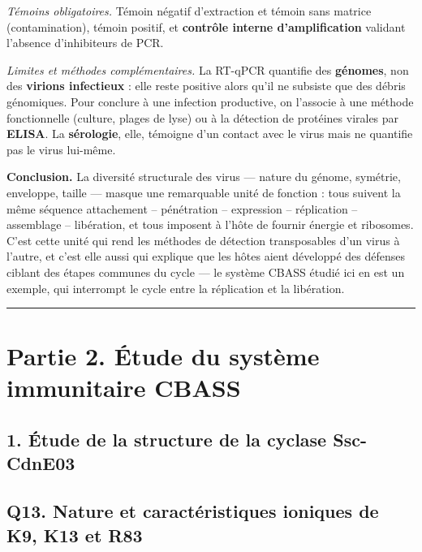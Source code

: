\documentclass[11pt,a4paper]{article}
\begin{document}
\emph{Témoins obligatoires.} Témoin négatif d'extraction et témoin sans matrice (contamination), témoin positif, et \textbf{contrôle interne d'amplification} validant l'absence d'inhibiteurs de PCR.

\emph{Limites et méthodes complémentaires.} La RT-qPCR quantifie des \textbf{génomes}, non des \textbf{virions infectieux} : elle reste positive alors qu'il ne subsiste que des débris génomiques. Pour conclure à une infection productive, on l'associe à une méthode fonctionnelle (culture, plages de lyse) ou à la détection de protéines virales par \textbf{ELISA}. La \textbf{sérologie}, elle, témoigne d'un contact avec le virus mais ne quantifie pas le virus lui-même.

\textbf{Conclusion.} La diversité structurale des virus --- nature du génome, symétrie, enveloppe, taille --- masque une remarquable unité de fonction : tous suivent la même séquence attachement -- pénétration -- expression -- réplication -- assemblage -- libération, et tous imposent à l'hôte de fournir énergie et ribosomes. C'est cette unité qui rend les méthodes de détection transposables d'un virus à l'autre, et c'est elle aussi qui explique que les hôtes aient développé des défenses ciblant des étapes communes du cycle --- le système CBASS étudié ici en est un exemple, qui interrompt le cycle entre la réplication et la libération.

\begin{center}\rule{0.5\linewidth}{0.5pt}\end{center}

\hypertarget{partie-2.-uxe9tude-du-systuxe8me-immunitaire-cbass}{%
\section{Partie 2. Étude du système immunitaire CBASS}\label{partie-2.-uxe9tude-du-systuxe8me-immunitaire-cbass}}

\hypertarget{uxe9tude-de-la-structure-de-la-cyclase-ssc-cdne03}{%
\subsection{1. Étude de la structure de la cyclase Ssc-CdnE03}\label{uxe9tude-de-la-structure-de-la-cyclase-ssc-cdne03}}

\hypertarget{q13.-nature-et-caractuxe9ristiques-ioniques-de-k9-k13-et-r83}{%
\subsection{Q13. Nature et caractéristiques ioniques de K9, K13 et R83}\label{q13.-nature-et-caractuxe9ristiques-ioniques-de-k9-k13-et-r83}}
\end{document}
